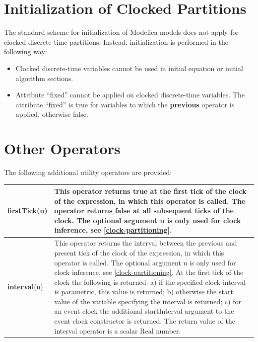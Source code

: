 \documentclass[10pt,a4paper]{report}
\def\doublelabel#1{\label{#1}\hypertarget{#1}{}}
\begin{document}
\section{Initialization of Clocked Partitions}\doublelabel{initialization-of-clocked-partitions}

The standard scheme for initialization of Modelica models does not apply
for clocked discrete-time partitions. Instead, initialization is
performed in the following way:

\begin{itemize}
\item
  Clocked discrete-time variables cannot be used in initial equation or
  initial algorithm sections.
\item
  Attribute ``fixed'' cannot be applied on clocked discrete-time
  variables. The attribute ``fixed'' is true for variables to which the
  \textbf{previous} operator is applied, otherwise false.
\end{itemize}

\section{Other Operators}\doublelabel{other-operators}

The following additional utility operators are provided:

\begin{longtable}[]{@{}ll@{}}
\endhead
\hline
\textbf{firstTick}(u)&
This operator returns true at the first tick of the clock of the
expression, in which this operator is called. The operator returns false
at all subsequent ticks of the clock. The optional argument u is only
used for clock inference, see \ref{clock-partitioning}.\\ \hline
\textbf{interval}(u)&
This operator returns the interval between the previous and present tick
of the clock of the expression, in which this operator is called. The
optional argument u is only used for clock inference, see \ref{clock-partitioning}.
At the first tick of the clock the following is returned: a) if the
specified clock interval is parametric, this value is returned; b)
otherwise the start value of the variable specifying the interval is
returned; c) for an event clock the additional startInterval argument to
the event clock constructor is returned. The return value of the
interval operator is a scalar Real number.
\\ \hline
\end{longtable}
\end{document}
